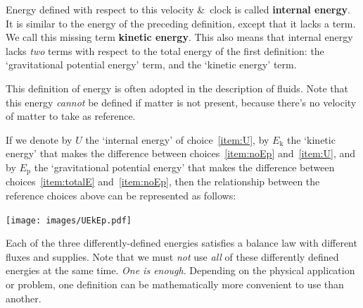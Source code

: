 \documentclass[a4paper,12pt,%
onecolumn,oneside,%
british%
]{memoir}
\newcommand*{\amp}{\&}
\renewcommand*{\|}[1][]{\nonscript\:#1\vert\nonscript\:\mathopen{}}
\newcommand*{\yE}{E}
\newcommand*{\yU}{U}
\newcommand*{\yEk}{\yE_{\textrm{k}}}%
\newcommand*{\yEp}{\yE_{\textrm{p}}}%
\begin{document}
\begin{enumerate}[label=E\arabic*]
  Energy  defined with respect to this velocity \amp\ clock is called \textbf{internal energy}. %
  It is similar to the energy of the preceding definition, except that it lacks a term. We call this missing term \textbf{kinetic energy}. This also means that internal energy lacks \emph{two} terms with respect to the total energy of the first definition: the \enquote*{gravitational potential energy} term, and the \enquote*{kinetic energy} term.

  This definition of energy is often adopted in the description of fluids. Note that this energy \emph{cannot} be defined if matter is not present, because there's no velocity of matter to take as reference.
\end{enumerate}

If we denote by $\yU$ the \enquote*{internal energy} of choice~\ref{item:U}, by $\yEk$ the \enquote*{kinetic energy} that makes the difference between choices~\ref{item:noEp} and~\ref{item:U}, and by $\yEp$ the \enquote*{gravitational potential energy} that makes the difference between choices~\ref{item:totalE} and~\ref{item:noEp}, then the relationship between the reference choices above can be represented as follows:
\begin{center}
  \texttt{[image: images/UEkEp.pdf]}
\end{center}

Each of the three differently-defined energies satisfies a balance law with different fluxes and supplies. Note that we must \emph{not} use \emph{all} of these differently defined energies at the same time. \emph{One is enough}. Depending on the physical application or problem, one definition can be mathematically more convenient to use than another.


\end{document}
